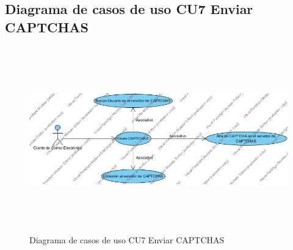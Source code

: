 \subsection{Diagrama de casos de uso CU7 Enviar CAPTCHAS}
\begin{figure}[H]
	\includegraphics[width=1\linewidth, height=8cm]{./images/casodeuso9.jpg}
	\caption{Diagrama de casos de uso CU7 Enviar CAPTCHAS}
	\label{fig:4-10-1}
\end{figure}

